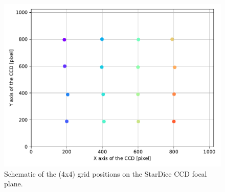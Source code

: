 \begin{figure}
    \centering
    \includegraphics[width=\columnwidth]{fig/ccd_grid_colors.pdf}
    \caption{Schematic of the (4x4) grid positions on the StarDice CCD focal plane.}
    \label{fig:ccd_grid}
\end{figure}

\newpage